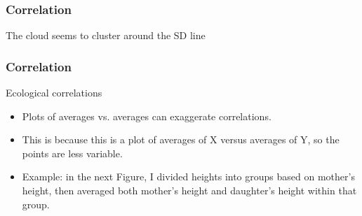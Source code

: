 \documentclass[handout]{beamer}
\begin{document}


   \begin{frame}
   \frametitle{Correlation}
   \begin{center}
   \end{center}
   The cloud seems to cluster around the SD line
   \end{frame}


   \begin{frame} \frametitle{Correlation}

   \begin{block}
   {Ecological correlations}
   \begin{itemize}
   \item Plots of averages vs. averages can exaggerate correlations.
   \item This is because this is a plot of averages of X versus averages of Y, so the points are less variable.
   \item Example: in the next Figure, I divided heights into groups based on mother's height, then averaged both mother's height and daughter's height within that group.
   \end{itemize}
   \end{block}
   \end{frame}

\end{document}
